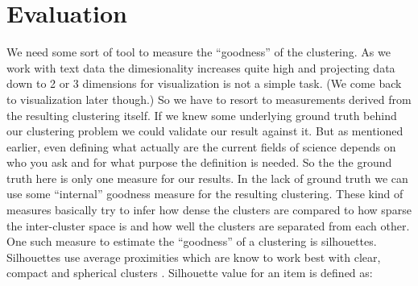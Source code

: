 \chapter{Evaluation}
\label{chapter:evaluation}

We need some sort of tool to measure the ``goodness'' of the 
clustering. As we work with text data the dimesionality increases 
quite high and projecting data down to 2 or 3 dimensions for 
visualization is not a simple task. (We come back to visualization 
later though.)
So we have to resort to measurements derived from the 
resulting clustering itself. If we knew some underlying ground 
truth behind our clustering problem we could validate our result 
against it. But as mentioned earlier, even defining what actually 
are the current fields of science depends on who you ask and for 
what purpose the definition is needed. So the the ground truth 
here is only one measure for our results.
In the lack of ground truth we can use some ``internal'' goodness 
measure for the resulting clustering. These kind of measures 
basically try to infer how dense the clusters are compared to how 
sparse the inter-cluster space is and how well the clusters are 
separated from each other.
One such measure to estimate the ``goodness'' of a clustering is 
silhouettes. Silhouettes use average proximities which are know 
to work best with clear, compact and spherical clusters 
\cite{rousseeuw_silhouettes:_1987}. Silhouette value for an item 
is defined as:

